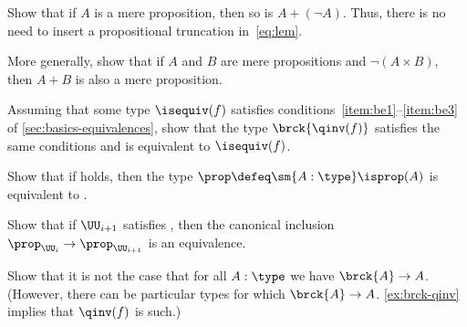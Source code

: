 \begin{ex}\label{ex:lem-mereprop}
  Show that if $A$ is a mere proposition, then so is $A+(\neg A)$.
  Thus, there is no need to insert a propositional truncation in~\eqref{eq:lem}.
\end{ex}

\begin{ex}\label{ex:disjoint-or}
  More generally, show that if $A$ and $B$ are mere propositions and $\neg(A\times B)$, then $A+B$ is also a mere proposition.
\end{ex}




\begin{ex}\label{ex:brck-qinv}
  Assuming that some type $\isequiv(f)$ satisfies conditions~\ref{item:be1}--\ref{item:be3} of \cref{sec:basics-equivalences}, show that the type $\brck{\qinv(f)}$ satisfies the same conditions and is equivalent to $\isequiv(f)$.
\end{ex}

\begin{ex}\label{ex:lem-impl-prop-equiv-bool}
  Show that if \LEM{} holds, then the type $\prop \defeq \sm{A:\type} \isprop(A)$ is equivalent to \bool.
\end{ex}

\begin{ex}\label{ex:lem-impred}
  Show that if $\UU_{i+1}$ satisfies \LEM{}, then the canonical inclusion $\prop_{\UU_i} \to \prop_{\UU_{i+1}}$ is an equivalence.
\end{ex}

\begin{ex}\label{ex:not-brck-A-impl-A}
  Show that it is not the case that for all $A:\type$ we have $\brck{A} \to A$.
  (However, there can be particular types for which $\brck{A}\to A$.
  \cref{ex:brck-qinv} implies that $\qinv(f)$ is such.)
\end{ex}

